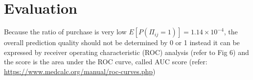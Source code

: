\documentclass{article}
\begin{document}
\section*{Evaluation}
Because the ratio of purchase is very low $E[P(\Pi_{ij}=1)] = 1.14\times 10^{-4}$, the overall prediction quality should not be determined by 0 or 1 instead it can be expressed by receiver operating characteristic (ROC) analysis (refer to Fig 6) and the score is the area under the ROC curve, called AUC score (refer: \url{https://www.medcalc.org/manual/roc-curves.php})
\end{document}
